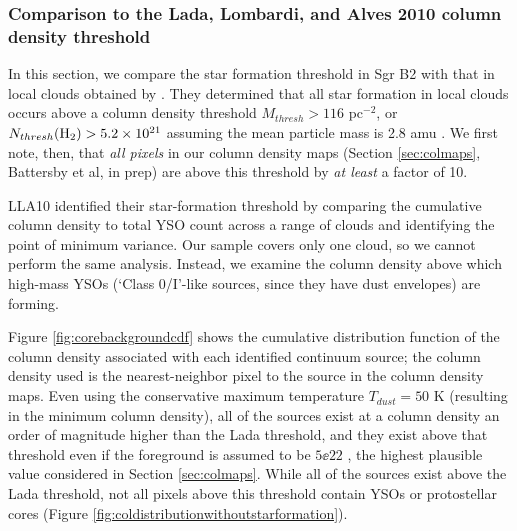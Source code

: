 \documentclass[twocolumn]{aastex61}
\begin{document}
\subsubsection{Comparison to the Lada, Lombardi, and Alves 2010 column density threshold}
\label{sec:ladathreshold}
In this section, we compare the star formation threshold in Sgr B2 with that in
local clouds obtained by \citet[][hereafter, LLA10]{Lada2010a}.  They determined
that all star
formation in local clouds occurs above a column density threshold $M_{thresh} >
116$ \msun pc$^{-2}$, or $N_{thresh}(\textrm{H}_{2}) > 5.2\times10^{21}$ \persc assuming the
mean particle mass is 2.8 amu \citep{Kauffmann2008a}.  We first note, then,
that \emph{all pixels} in our column density maps (Section \ref{sec:colmaps},
Battersby et al, in prep) are above this threshold by \emph{at least} a factor
of 10.

LLA10 identified their star-formation threshold by comparing the
cumulative column density to total YSO count across a range of clouds and
identifying the point of minimum variance.  Our sample covers only one cloud,
so we cannot perform the same analysis.  Instead, we examine the column density
above which high-mass YSOs (`Class 0/I'-like sources, since they have dust
envelopes) are forming.

Figure \ref{fig:corebackgroundcdf} shows the cumulative distribution function
of the column density associated with each identified continuum source; the
column density used is the nearest-neighbor pixel to the source in the column
density maps.  Even using the conservative maximum temperature $T_{dust}=50$ K
(resulting in the minimum column density), all of the sources exist at a column
density an order of magnitude higher than the Lada threshold, and they exist
above that threshold even if the foreground is assumed to be $5\ee{22}$ \persc,
the highest plausible value considered in Section \ref{sec:colmaps}.
While all of the sources exist above the Lada threshold, not all pixels above
this threshold contain YSOs or protostellar cores (Figure
\ref{fig:coldistributionwithoutstarformation}).
\end{document}
